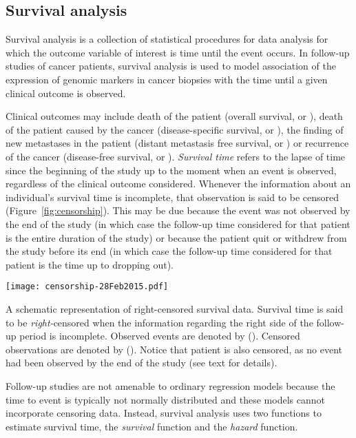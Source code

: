 \subsection{Survival analysis}
\label{sec:methods-survival-analysis}

Survival analysis is a collection of statistical procedures for data analysis
for which the outcome variable of interest is time until the event
occurs.\cite{kleinbaum_survival_1996} In follow-up studies of cancer patients,
survival analysis is used to model association of the expression of genomic
markers in cancer biopsies with the time until a given clinical outcome is
observed.

Clinical outcomes may include death of the patient (overall survival, or
), death of the patient caused by the cancer (disease-specific
survival, or ), the finding of new metastases in the patient
(distant metastasis free survival, or ) or recurrence of the
cancer (disease-free survival, or ).  \emph{Survival time} refers
to the lapse of time since the beginning of the study up to the moment when an
event is observed, regardless of the clinical outcome considered.  Whenever the
information about an individual's survival time is incomplete, that observation
is said to be censored (Figure~\ref{fig:censorship}).  This may be due because
the event was not observed by the end of the study (in which case the follow-up
time considered for that patient is the entire duration of the study) or because
the patient quit or withdrew from the study before its end (in which case the
follow-up time considered for that patient is the time up to dropping out).

\begin{marginfigure}%
  \texttt{[image: censorship-28Feb2015.pdf]}
  \caption[Right-censored survival data]{A schematic representation of
    right-censored survival data.  Survival time is said to be
    \emph{right-}censored when the information regarding the right side of the
    follow-up period is incomplete.  Observed events are denoted by (\CIRCLE).
    Censored observations are denoted by (\Circle).  Notice that patient
     is also censored, as no event had been observed by the end
    of the study (see text for details).}\label{fig:censorship}%
\end{marginfigure}

Follow-up studies are not amenable to ordinary regression models because the
time to event is typically not normally distributed and these models cannot
incorporate censoring data.  Instead, survival analysis uses two functions to
estimate survival time, the \emph{survival} function and the \emph{hazard}
function.

